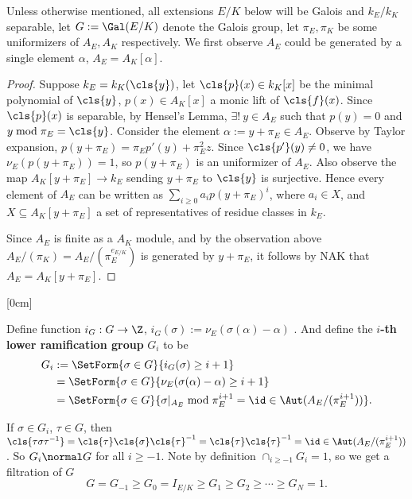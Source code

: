 \documentclass[11pt]{amsart}
\begin{document}
Unless otherwise mentioned, all extensions $E/K$ below will be Galois and
$k_E/k_K$ separable, let $G := \Gal(E/K)$ denote the Galois group, let $\pi_E,
\pi_K$ be some uniformizers of $A_E, A_K$ respectively.  We first observe $A_E$
could be generated by a single element $\alpha$, $A_E = A_K[\alpha]$.

\begin{proof}
    Suppose $k_E = k_K(\cls{y})$, let $\cls{p}(x) \in k_K[x]$ be the minimal
    polynomial of $\cls{y}$, $p(x) \in A_K[x]$ a monic lift of $\cls{f}(x)$.
    Since $\cls{p}(x)$ is separable, by Hensel's Lemma, $\exists!\ y \in A_E$
    such that $p(y) = 0$ and $y \bmod{\pi_E} = \cls{y}$.  Consider the element
    $\alpha := y + \pi_E \in A_E$.  Observe by Taylor expansion, $p(y + \pi_E) =
    \pi_E p'(y) + \pi_E^2 z$.  Since $\cls{p'}(y) \neq 0$, we have $\nu_E(p(y +
    \pi_E)) = 1$, so $p(y + \pi_E)$ is an uniformizer of $A_E$.  Also observe
    the map $A_K[y + \pi_E] \to k_E$ sending $y + \pi_E$ to $\cls{y}$ is
    surjective.  Hence every element of $A_E$ can be written as $\sum_{i \geq 0}
    a_i p(y + \pi_E)^i$, where $a_i \in X$, and $X \subseteq A_K[y + \pi_E]$ a
    set of representatives of residue classes in $k_E$.

    Since $A_E$ is finite as a $A_K$ module, and by the observation above
    $A_E/(\pi_K) = A_E/(\pi_E^{e_{E/K}})$ is generated by $y + \pi_E$, it
    follows by NAK that $A_E = A_K[y + \pi_E]$.
\end{proof}

[0cm]

Define function $i_G : G \to \Z$, $i_G(\sigma) := \nu_E(\sigma(\alpha) -
\alpha)$ .   And define the {\bf $i$-th lower ramification
    group}  $G_i$ to be
\begin{align*}
    G_i
    & := \SetForm{\sigma \in G}{i_G(\sigma) \geq i + 1}\\
    & = \SetForm{\sigma \in G}{\nu_E(\sigma(\alpha) - \alpha) \geq i + 1}\\
    & = \SetForm{\sigma \in G}{\sigma|_{A_E} \bmod{\pi_E^{i+1}} = \id \in
        \Aut(A_E/(\pi_E^{i+1}))}.
\end{align*}

If $\sigma \in G_i$, $\tau \in G$, then $\cls{\tau \sigma \tau^{-1}} =
\cls{\tau} \cls{\sigma} \cls{\tau}^{-1} = \cls{\tau}\cls{\tau}^{-1} = \id \in
\Aut(A_E/(\pi_E^{i+1}))$.  So $G_i \normal G$ for all $i \geq -1$.  Note by
definition $\cap_{i \geq -1} G_i = 1$, so we get a filtration of $G$
\[
    G = G_{-1} \geq G_0 = I_{E/K} \geq G_1 \geq G_2 \geq \cdots \geq G_N = 1.
\]
\end{document}

